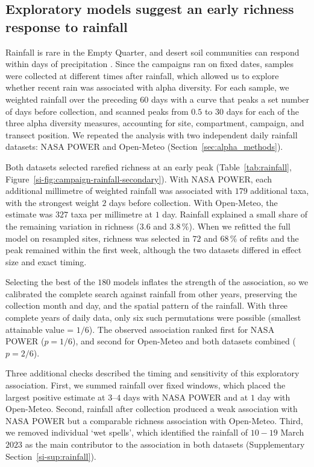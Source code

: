 \documentclass[fleqn,10pt,numbers]{olplainarticle}
\begin{document}
\subsection*{Exploratory models suggest an early richness response to rainfall}

Rainfall is rare in the Empty Quarter, and desert soil communities can respond within days of precipitation \cite{huxman2004precipitation,schwinning2004pulse}. Since the campaigns ran on fixed dates, samples were collected at different times after rainfall, which allowed us to explore whether recent rain was associated with alpha diversity. For each sample, we weighted rainfall over the preceding $60$ days with a curve that peaks a set number of days before collection, and scanned peaks from $0.5$ to $30$ days for each of the three alpha diversity measures, accounting for site, compartment, campaign, and transect position. We repeated the analysis with two independent daily rainfall datasets: NASA POWER \cite{nasa_power_2024} and Open-Meteo \cite{openmeteo} (Section~\ref{sec:alpha_methods}).

Both datasets selected rarefied richness at an early peak (Table~\ref{tab:rainfall}, Figure~\ref{si-fig:campaign-rainfall-secondary}). With NASA POWER, each additional millimetre of weighted rainfall was associated with $179$ additional taxa, with the strongest weight $2$ days before collection. With Open-Meteo, the estimate was $327$ taxa per millimetre at $1$ day. Rainfall explained a small share of the remaining variation in richness ($3.6$ and $3.8\,\%$). When we refitted the full model on resampled sites, richness was selected in $72$ and $68\,\%$ of refits and the peak remained within the first week, although the two datasets differed in effect size and exact timing.

Selecting the best of the $180$ models inflates the strength of the association, so we calibrated the complete search against rainfall from other years, preserving the collection month and day, and the spatial pattern of the rainfall. With three complete years of daily data, only six such permutations were possible (smallest attainable value = $1/6$). The observed association ranked first for NASA POWER ($p=1/6$), and second for Open-Meteo and both datasets combined ($p=2/6$).

Three additional checks described the timing and sensitivity of this exploratory association. First, we summed rainfall over fixed windows, which placed the largest positive estimate at $3$--$4$ days with NASA POWER and at $1$ day with Open-Meteo. Second, rainfall after collection produced a weak association with NASA POWER but a comparable richness association with Open-Meteo. Third, we removed individual `wet spells', which identified the rainfall of $10-19$ March $2023$ as the main contributor to the association in both datasets (Supplementary Section~\ref{si-sup:rainfall}).
\end{document}
